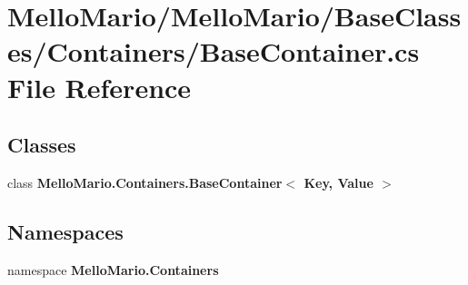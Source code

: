 \section{Mello\+Mario/\+Mello\+Mario/\+Base\+Classes/\+Containers/\+Base\+Container.cs File Reference}
\label{BaseContainer_8cs}
\subsection*{Classes}
\begin{DoxyCompactItemize}
\item 
class \textbf{ Mello\+Mario.\+Containers.\+Base\+Container$<$ Key, Value $>$}
\end{DoxyCompactItemize}
\subsection*{Namespaces}
\begin{DoxyCompactItemize}
\item 
namespace \textbf{ Mello\+Mario.\+Containers}
\end{DoxyCompactItemize}
